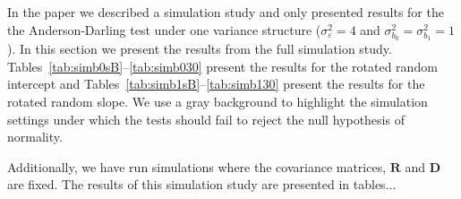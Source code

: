 \documentclass[11pt]{article} %
\begin{document}
In the paper we described a simulation study and only presented results for the the Anderson-Darling test under one variance structure ($\sigma^2_\varepsilon = 4$ and $\sigma^2_{b_0} = \sigma^2_{b_1} = 1$). In this section we present the results from the full simulation study. Tables~\ref{tab:simb0sB}--\ref{tab:simb030} present the results for the rotated random intercept and Tables~\ref{tab:simb1sB}--\ref{tab:simb130} present the results for the rotated random slope. We use a gray background to highlight the simulation settings under which the tests should fail to reject the null hypothesis of normality.

Additionally, we have run simulations where the covariance matrices, $\bm{R}$ and $\bm{D}$ are fixed. The results of this simulation study are presented in tables...





%
%
%




\end{document}
